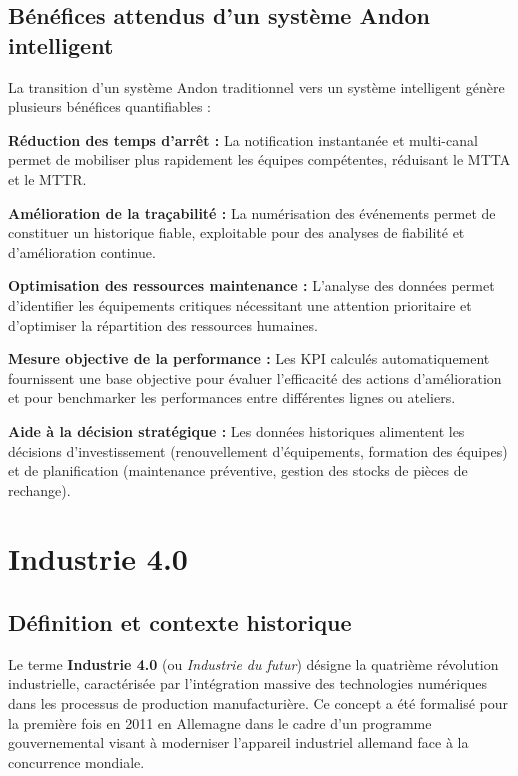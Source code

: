 \subsection{Bénéfices attendus d'un système Andon intelligent}

La transition d'un système Andon traditionnel vers un système intelligent génère plusieurs bénéfices quantifiables :

\textbf{Réduction des temps d'arrêt :} La notification instantanée et multi-canal permet de mobiliser plus rapidement les équipes compétentes, réduisant le MTTA et le MTTR.

\textbf{Amélioration de la traçabilité :} La numérisation des événements permet de constituer un historique fiable, exploitable pour des analyses de fiabilité et d'amélioration continue.

\textbf{Optimisation des ressources maintenance :} L'analyse des données permet d'identifier les équipements critiques nécessitant une attention prioritaire et d'optimiser la répartition des ressources humaines.

\textbf{Mesure objective de la performance :} Les KPI calculés automatiquement fournissent une base objective pour évaluer l'efficacité des actions d'amélioration et pour benchmarker les performances entre différentes lignes ou ateliers.

\textbf{Aide à la décision stratégique :} Les données historiques alimentent les décisions d'investissement (renouvellement d'équipements, formation des équipes) et de planification (maintenance préventive, gestion des stocks de pièces de rechange).

\section{Industrie 4.0}

\subsection{Définition et contexte historique}

Le terme \textbf{Industrie 4.0} (ou \textit{Industrie du futur}) désigne la quatrième révolution industrielle, caractérisée par l'intégration massive des technologies numériques dans les processus de production manufacturière. Ce concept a été formalisé pour la première fois en 2011 en Allemagne dans le cadre d'un programme gouvernemental visant à moderniser l'appareil industriel allemand face à la concurrence mondiale.

